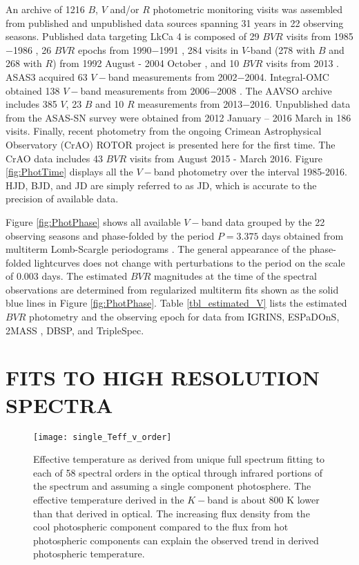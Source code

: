 \documentclass[twocolumn]{emulateapj}%
\newcommand{\name}{LkCa 4 }
\begin{document}
An archive of 1216 $B$, $V$ and/or $R$ photometric monitoring visits was assembled from published and unpublished data sources spanning 31 years in 22 observing seasons.  Published data targeting \name is composed of 29 $BVR$ visits from 1985$-$1986 \citep{vrba93}, 26 $BVR$ epochs from 1990$-$1991 \citep{bouvier93}, 284 visits in $V$-band (278 with $B$ and 268 with $R$) from 1992 August - 2004 October \citep{grankin08}, and 10 $BVR$ visits from 2013 \citep{donati14}.  ASAS3 \citep{pojmanski04} acquired 63 $V-$band measurements from 2002$-$2004.  Integral-OMC obtained 138 $V-$band measurements from 2006$-$2008 \citep{garzon12}.  The AAVSO archive \citep{kafka16} includes 385 $V$, 23 $B$ and 10 $R$ measurements from 2013$-$2016.  Unpublished data from the ASAS-SN survey \citep{shappee14} were obtained from 2012 January -- 2016 March in 186 visits.  Finally, recent photometry from the ongoing Crimean Astrophysical Observatory (CrAO) ROTOR project \citep{grankin08} is presented here for the first time.  The CrAO data includes 43 $BVR$ visits from August 2015 - March 2016. Figure \ref{fig:PhotTime} displays all the $V-$band photometry over the interval 1985-2016.  HJD, BJD, and JD are simply referred to as JD, which is accurate to the precision of available data.


Figure \ref{fig:PhotPhase} shows all available $V-$band data grouped by the 22 observing seasons and phase-folded by the period $P=3.375$ days obtained from multiterm Lomb-Scargle periodograms \citep{ivezic14}.  The general appearance of the phase-folded lightcurves does not change with perturbations to the period on the scale of 0.003 days.  The estimated $BVR$ magnitudes at the time of the spectral observations are determined from regularized multiterm fits \citep[\emph{i.e.} Fourier series truncated to the first $\sim 4$ components]{vanderplas15a} shown as the solid blue lines in Figure \ref{fig:PhotPhase}.  Table \ref{tbl_estimated_V} lists the estimated $BVR$ photometry and the observing epoch for data from IGRINS, ESPaDOnS, 2MASS \citep{skrutskie06}, DBSP, and TripleSpec.  





\section{FITS TO HIGH RESOLUTION SPECTRA}\label{sec:Starfish}

\begin{figure}
 \centering
 \texttt{[image: single\_Teff\_v\_order]}
 \caption{Effective temperature as derived from unique full spectrum fitting to each of 58 spectral orders in the optical through infrared portions of the spectrum and assuming a single component photosphere.  The effective temperature derived in the $K-$band is about 800 K lower than that derived in optical.  The increasing flux density from the cool photospheric component compared to the flux from hot photospheric components can explain the observed trend in derived photospheric temperature.}
 \label{fig:SingleTeffvsOrder}
\end{figure}
\end{document}
